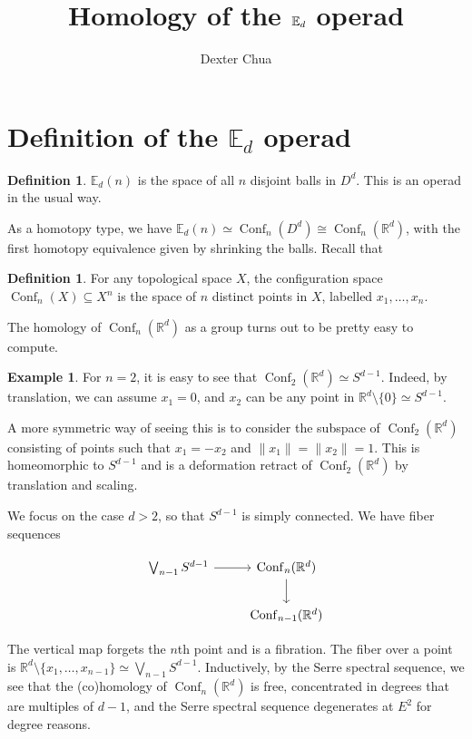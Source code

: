 \documentclass{shortart}
\title{Homology of the \texorpdfstring{$\E_d$}{Ed} operad}
\author{Dexter Chua}
\newcommand\E{\mathbb{E}}
\theoremstyle{definition}
\newtheorem{defi}[thm]{Definition}
\newtheorem{eg}[thm]{Example}
\DeclareMathOperator\Conf{Conf}
\newcommand\R{\mathbb{R}}
\begin{document}
\section{Definition of the \texorpdfstring{$\E_d$}{Ed} operad}

\begin{defi}
  $\E_d(n)$ is the space of all $n$ disjoint balls in $D^d$. This is an operad in the usual way.
\end{defi}

As a homotopy type, we have $\E_d(n) \simeq \Conf_n(D^d) \cong \Conf_n(\R^d)$, with the first homotopy equivalence given by shrinking the balls. Recall that
\begin{defi}
  For any topological space $X$, the configuration space $\Conf_n(X) \subseteq X^n$ is the space of $n$ distinct points in $X$, labelled $x_1, \ldots, x_n$.
\end{defi}

The homology of $\Conf_n(\R^d)$ as a group turns out to be pretty easy to compute.

\begin{eg}
  For $n = 2$, it is easy to see that $\Conf_2(\R^d) \simeq S^{d - 1}$. Indeed, by translation, we can assume $x_1 = 0$, and $x_2$ can be any point in $\R^d \setminus \{0\} \simeq S^{d - 1}$.

  A more symmetric way of seeing this is to consider the subspace of $\Conf_2(\R^d)$ consisting of points such that $x_1 = - x_2$ and $\|x_1\| = \|x_2\| = 1$. This is homeomorphic to $S^{d - 1}$ and is a deformation retract of $\Conf_2(\R^d)$ by translation and scaling.
\end{eg}

We focus on the case $d > 2$, so that $S^{d - 1}$ is simply connected. We have fiber sequences
\begin{useimager}
  \[
    \begin{tikzcd}
      \bigvee_{n - 1} S^{d - 1} \ar[r] & \Conf_n(\R^d) \ar[d]\\
      & \Conf_{n - 1}(\R^d)
    \end{tikzcd}
  \]
\end{useimager}
The vertical map forgets the $n$th point and is a fibration. The fiber over a point is $\R^d \setminus \{x_1, \ldots, x_{n - 1}\} \simeq \bigvee_{n - 1} S^{d - 1}$. Inductively, by the Serre spectral sequence, we see that the (co)homology of $\Conf_n(\R^d)$ is free, concentrated in degrees that are multiples of $d - 1$, and the Serre spectral sequence degenerates at $E^2$ for degree reasons.
\end{document}
